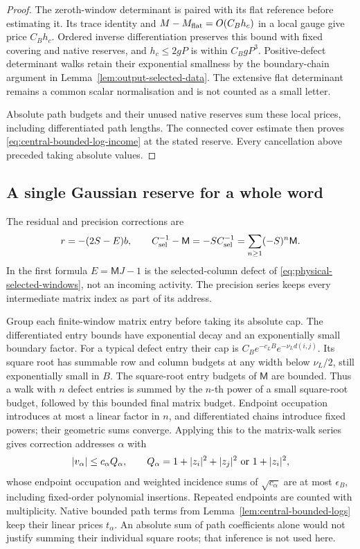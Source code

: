 \documentclass[11pt,reqno]{amsart}
\numberwithin{equation}{section}
\theoremstyle{definition}
\theoremstyle{remark}
\begin{document}
\begin{proof}
The zeroth-window determinant is paired with its flat
reference before estimating it. Its trace identity and
\(M-M_{\rm flat}=O(C_Bh_c)\) in a local gauge give price
\(C_Bh_c\). Ordered inverse differentiation preserves this
bound with fixed covering and native reserves, and
\(h_c\le2gP\) is within \(C_BgP^3\). Positive-defect
determinant walks retain their exponential smallness by
the boundary-chain argument in
Lemma~\ref{lem:output-selected-data}.
The extensive flat determinant remains a common scalar
normalisation and is not counted as a small letter.

Absolute path budgets and their unused native reserves sum
these local prices, including differentiated path lengths.
The connected cover estimate then proves
\eqref{eq:central-bounded-log-income} at the stated reserve.
Every cancellation above preceded taking absolute values.
\end{proof}

\subsection{A single Gaussian reserve for a whole word}

The residual and precision corrections are
\[
 r=-(2S-E)b,\qquad
 C_{\rm sel}^{-1}-\mathsf M=-S C_{\rm sel}^{-1}
                    =\sum_{n\ge1}(-S)^n\mathsf M.
\]
In the first formula \(E=\mathsf MJ-1\) is the selected-column
defect of \eqref{eq:physical-selected-windows}, not an incoming
activity. The precision series keeps every intermediate matrix
index as part of its address.

Group each finite-window matrix entry before taking its absolute
cap. The differentiated entry bounds have exponential decay
and an exponentially small boundary factor. For a typical defect
entry their cap is \(C_Be^{-c_LB}e^{-\nu_Ld(i,j)}\). Its square
root has summable row and column budgets at any width below
\(\nu_L/2\), still exponentially small in \(B\). The square-root
entry budgets of \(\mathsf M\) are bounded. Thus a walk with
\(n\) defect entries is summed by the \(n\)-th power of a small
square-root budget, followed by this bounded final matrix budget.
Endpoint occupation introduces at most a linear factor in
\(n\), and differentiated chains introduce fixed powers;
their geometric sums converge. Applying this to the
matrix-walk series gives correction addresses \(\alpha\) with
\begin{equation}
 |v_\alpha|\le c_\alpha Q_\alpha,\qquad
 Q_\alpha=1+|z_i|^2+|z_j|^2
       \ \hbox{or}\ 1+|z_i|^2,
 \label{eq:central-Gaussian-letter-cap}
\end{equation}
whose endpoint occupation and weighted incidence sums of
\(\sqrt{c_\alpha}\) are at most \(\epsilon_B\), including
fixed-order polynomial insertions. Repeated endpoints are
counted with multiplicity. Native bounded path terms from
Lemma~\ref{lem:central-bounded-logs} keep their linear prices
\(t_\alpha\). An absolute sum of path coefficients alone
would not justify summing their individual square roots;
that inference is not used here.
\end{document}
